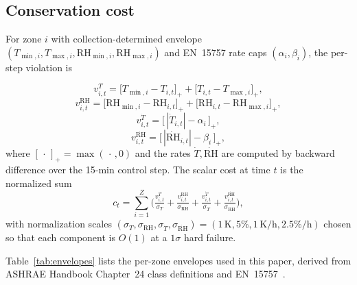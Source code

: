 \subsection{Conservation cost}\label{sec:conservation_cost}

For zone $i$ with collection-determined envelope
$(T_{\min,i},T_{\max,i},\mathrm{RH}_{\min,i},\mathrm{RH}_{\max,i})$ and
EN~15757 rate caps $(\alpha_i,\beta_i)$, the per-step violation is

\begin{equation}
v^{T}_{i,t}  = \big[T_{\min,i}-T_{i,t}\big]_+ + \big[T_{i,t}-T_{\max,i}\big]_+,
\label{eq:vT}
\end{equation}
\begin{equation}
v^{\mathrm{RH}}_{i,t}= \big[\mathrm{RH}_{\min,i}-\mathrm{RH}_{i,t}\big]_+ +
                       \big[\mathrm{RH}_{i,t}-\mathrm{RH}_{\max,i}\big]_+,
\label{eq:vRH}
\end{equation}
\begin{equation}
v^{\dot T}_{i,t}     = \big[\,|\dot T_{i,t}|-\alpha_i\,\big]_+,
\label{eq:vTdot}
\end{equation}
\begin{equation}
v^{\dot{\mathrm{RH}}}_{i,t} = \big[\,|\dot{\mathrm{RH}}_{i,t}|-\beta_i\,\big]_+,
\label{eq:vRHdot}
\end{equation}
where $[\,\cdot\,]_+=\max(\,\cdot\,,0)$ and the rates $\dot T,
\dot{\mathrm{RH}}$ are computed by backward difference over the 15-min
control step. The scalar cost at time $t$ is the normalized sum
\begin{equation}
c_t = \sum_{i=1}^{Z}\Big(
   \tfrac{v^{T}_{i,t}}{\sigma_T}
 + \tfrac{v^{\mathrm{RH}}_{i,t}}{\sigma_{\mathrm{RH}}}
 + \tfrac{v^{\dot T}_{i,t}}{\sigma_{\dot T}}
 + \tfrac{v^{\dot{\mathrm{RH}}}_{i,t}}{\sigma_{\dot{\mathrm{RH}}}}\Big),
\label{eq:cost}
\end{equation}
with normalization scales $(\sigma_T,\sigma_{\mathrm{RH}},\sigma_{\dot T},
\sigma_{\dot{\mathrm{RH}}})=(1\,\mathrm{K},5\%,1\,\mathrm{K/h},2.5\%/\mathrm{h})$
chosen so that each component is $O(1)$ at a $1\sigma$ hard failure.

Table~\ref{tab:envelopes} lists the per-zone envelopes used in this
paper, derived from ASHRAE Handbook Chapter~24 class definitions
\citep{ashrae_handbook_ch24} and EN~15757~\citep{en15757}.

